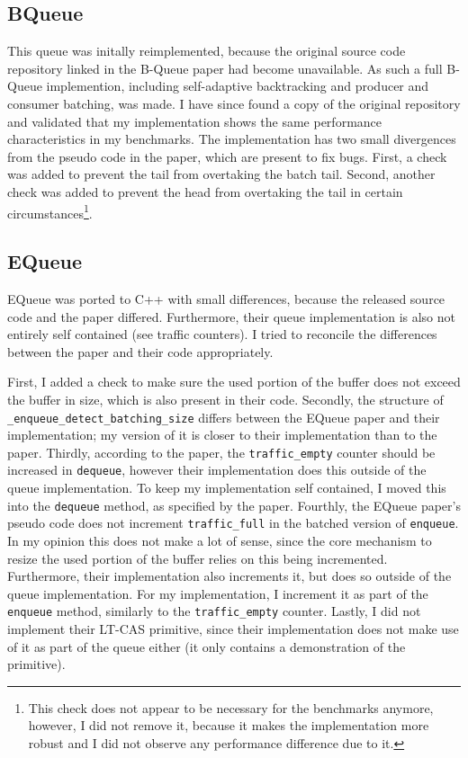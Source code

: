 


\subsection{BQueue}
This queue was initally reimplemented, because the original source code repository linked in the B-Queue
paper had become unavailable\cite{B-Queue}.
As such a full B-Queue implemention, including self-adaptive backtracking and producer and consumer batching, was made.
I have since found a copy of the original repository and validated that my implementation shows the same
performance characteristics in my benchmarks.
The implementation has two small divergences from the pseudo code in the paper, which are present to fix bugs.
First, a check was added to prevent the tail from overtaking the batch tail.
Second, another check was added to prevent the head from overtaking the tail in certain circumstances\footnote{
    This check does not appear to be necessary for the benchmarks anymore, however, I did not remove it,
because it makes the implementation more robust and I did not observe any performance difference due to it.}.

\subsection{EQueue}
EQueue was ported to C++ with small differences, because the released source code and the paper differed\cite{EQueue}.
Furthermore, their queue implementation is also not entirely self contained (see traffic counters).
I tried to reconcile the differences between the paper and their code appropriately.

First, I added a check to make sure the used portion of the buffer does not exceed the buffer in size, which
is also present in their code.
Secondly, the structure of \texttt{\_enqueue\_detect\_batching\_size} differs between the EQueue paper and
their implementation; my version of it is closer to their implementation than to the paper.
Thirdly, according to the paper, the \texttt{traffic\_empty} counter should be increased in \texttt{dequeue},
however their implementation does this outside of the queue implementation.
To keep my implementation self contained, I moved this into the \texttt{dequeue} method, as specified by the paper.
Fourthly, the EQueue paper's pseudo code does not increment \texttt{traffic\_full} in the batched version of
\texttt{enqueue}.
In my opinion this does not make a lot of sense, since the core mechanism to resize the used portion of the
buffer relies on this being incremented.
Furthermore, their implementation also increments it, but does so outside of the queue implementation.
For my implementation, I increment it as part of the \texttt{enqueue} method, similarly to the
\texttt{traffic\_empty} counter.
Lastly, I did not implement their LT-CAS primitive, since their implementation does not make use of it as
part of the queue either (it only contains a demonstration of the primitive).


